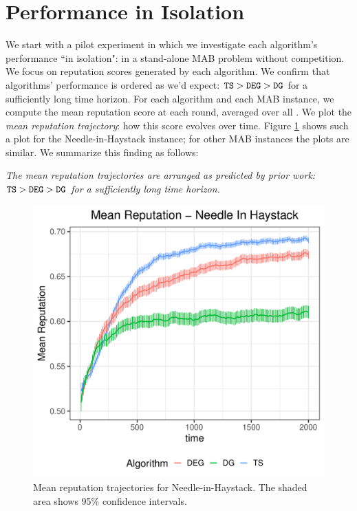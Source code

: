 \documentclass[../competing_bandits.tex]{subfiles}
\begin{document}
\section{Performance in Isolation}\label{sec:isolation}

We start with a pilot experiment in which we investigate each algorithm's performance ``in isolation": in a stand-alone MAB problem without competition. We focus on reputation scores generated by each algorithm. We confirm that algorithms' performance is ordered as we'd expect:
    $\mathtt{TS} > \mathtt{DEG} > \mathtt{DG}$
for a sufficiently long time horizon. For each algorithm and each MAB instance, we compute the mean reputation score at each round, averaged over all \MRVs. We plot the \emph{mean reputation trajectory}: how this score evolves over time. Figure \ref{prelim_means} shows such a plot for the Needle-in-Haystack instance; for other MAB instances the plots are similar. We summarize this finding as follows:

\begin{finding}
\textit{The mean reputation trajectories are arranged as predicted by prior work:
    $\mathtt{TS} > \mathtt{DEG} > \mathtt{DG}$ for a sufficiently long time horizon.}
\end{finding}


\begin{figure}
\includegraphics[scale=0.35]{ec19paper/figures/nih_iso_mean}
\caption{Mean reputation trajectories for Needle-in-Haystack. The shaded area shows 95\% confidence intervals.}
\label{prelim_means}
\end{figure}
\end{document}
